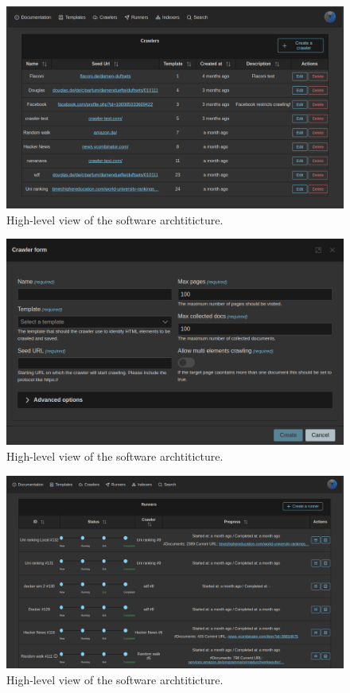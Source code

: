 \begin{figure}[h]	
     \centering
     \includegraphics[width=13cm]{images/demo-6.png}
     \caption{High-level view of the software archtiticture.}
     \label{fig:software-arch}
\end{figure}

\begin{figure}[h]	
     \centering
     \includegraphics[width=13cm]{images/demo-7.png}
     \caption{High-level view of the software archtiticture.}
     \label{fig:software-arch}
\end{figure}

\begin{figure}[h]	
     \centering
     \includegraphics[width=13cm]{images/demo-8.png}
     \caption{High-level view of the software archtiticture.}
     \label{fig:software-arch}
\end{figure}

